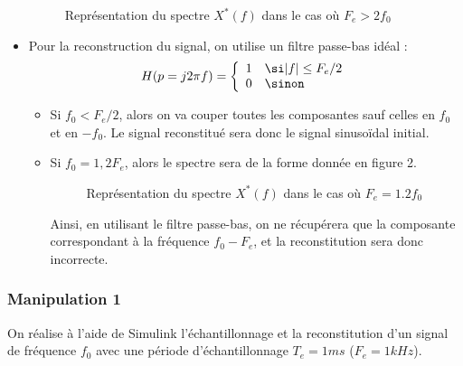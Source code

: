 \documentclass[../../Cours_M1.tex]{subfiles}
\begin{document}
\begin{itemize}
\begin{figure}[h!]
\begin{tikzpicture}
\end{tikzpicture}
\caption{Représentation du spectre $X^*(f)$ dans le cas où $F_e > 2f_0$}
\end{figure}

\item Pour la reconstruction du signal, on utilise un filtre passe-bas idéal :
\[ H(p=j2\pi f) = \left\{
\begin{array}{ll}
1 & \si |f| \leq F_e/2 \\
0 & \sinon
\end{array}
\right.
\]

\begin{itemize}
\item Si $f_0 < F_e / 2$, alors on va couper toutes les composantes sauf celles en $f_0$ et en $-f_0$. Le signal reconstitué sera donc le signal sinusoïdal initial.
\item Si $f_0 = 1,2F_e$, alors le spectre sera de la forme donnée en figure 2.
\begin{figure}[h!]
\centering
{}
\caption{Représentation du spectre $X^*(f)$ dans le cas où $F_e = 1.2f_0$}
\end{figure}

Ainsi, en utilisant le filtre passe-bas, on ne récupérera que la composante correspondant à la fréquence $f_0-F_e$, et la reconstitution sera donc incorrecte.

\end{itemize}

\end{itemize}

\clearpage
\subsubsection*{Manipulation 1}
On réalise à l'aide de Simulink l'échantillonnage et la reconstitution d'un signal de fréquence $f_0$ avec une période d'échantillonnage $T_e=1ms$ ($F_e=1kHz$).
\end{document}
